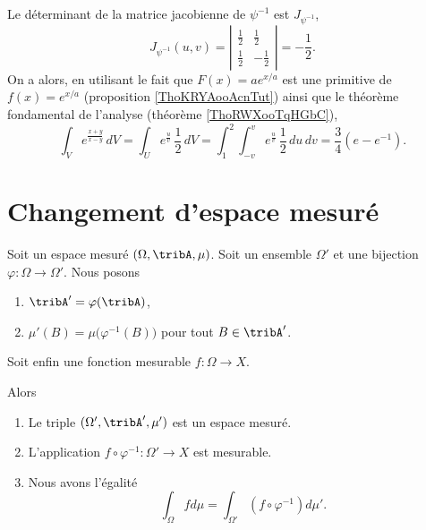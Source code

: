 \begin{example}
	Le déterminant de la  matrice  jacobienne de $\psi^{-1}$ est  $J_{\psi^{-1}}$,
	\begin{equation}
		J_{\psi^{-1}}(u,v)= \left\vert\begin{array}{cc}
			\frac{1}{2} & \frac{1}{2}  \\
			\frac{1}{2} & -\frac{1}{2}
		\end{array}\right\vert= -\frac{1}{2}.
	\end{equation}
	On a alors, en utilisant le fait que \( F(x)=a e^{x/a}\) est une primitive de \( f(x)= e^{x/a}\) (proposition \ref{ThoKRYAooAcnTut}) ainsi que le théorème fondamental de l'analyse (théorème \ref{ThoRWXooTqHGbC}),
	\[
		\int_{V}e^{\frac{x+y}{x-y}}\,dV=\int_{U}e^{\frac{u}{v}}\,\frac{1}{2}\,dV=\int_1^2\int_{-v}^{v}e^{\frac{u}{v}}\,\frac{1}{2}\, du\,dv= \frac{3}{4}(e-e^{-1}).
	\]
\end{example}


\section{Changement d'espace mesuré}

\begin{proposition}      \label{PROPooILOEooBiumKD}
	Soit un espace mesuré \( (\Omega,\tribA,\mu)\). Soit un ensemble \( \Omega'\) et une bijection \( \varphi\colon \Omega\to \Omega'\). Nous posons
	\begin{enumerate}
		\item
		      \( \tribA'=\varphi(\tribA)\),
		\item
		      \( \mu'(B)=\mu\big( \varphi^{-1}(B) \big)\) pour tout \( B\in\tribA'\).
	\end{enumerate}
	Soit enfin une fonction mesurable \( f\colon \Omega\to X\).

	Alors
	\begin{enumerate}
		\item
		      Le triple \( (\Omega',\tribA',\mu')\) est un espace mesuré.
		\item
		      L'application \( f\circ\varphi^{-1}\colon \Omega'\to X\) est mesurable.
		\item
		      Nous avons l'égalité
		      \begin{equation}
			      \int_{\Omega}fd\mu=\int_{\Omega'}(f\circ\varphi^{-1})d\mu'.
		      \end{equation}
	\end{enumerate}
\end{proposition}

